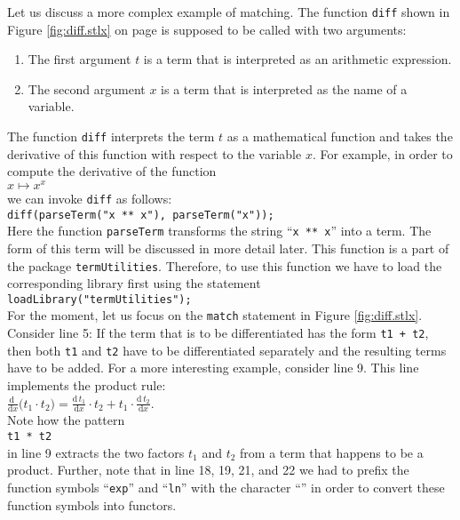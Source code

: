 Let us discuss a more complex example of matching.  The function \texttt{diff} shown in Figure
\ref{fig:diff.stlx} on page \pageref{fig:diff.stlx} is supposed to be called with two arguments:
\begin{enumerate}
\item The first argument $t$ is a term that is interpreted as an arithmetic expression.
\item The second argument $x$ is a term that is interpreted as  the name of a variable.
\end{enumerate}
The function \texttt{diff} interprets the term $t$ as a mathematical function and takes the
derivative of this function with respect to the variable $x$.  For example, in order to compute the
derivative of the function 
\\[0.2cm]
\hspace*{1.3cm}
$x \mapsto x^x$
\\[0.2cm]
we can invoke \texttt{diff} as follows:
\\[0.2cm]
\hspace*{1.3cm}
\texttt{diff(parseTerm("x ** x"), parseTerm("x"));}
\\[0.2cm]
Here the function \texttt{parseTerm} transforms the string ``\texttt{x ** x}'' into a term.  
The form of this term will be discussed in more detail later.  This function is a part of the
package \texttt{termUtilities}.  Therefore, to use this function we have to load the corresponding
library first using the statement
\\[0.2cm]
\hspace*{1.3cm}
\texttt{loadLibrary("termUtilities");}
\\[0.2cm]
For the moment, let us focus on the
\texttt{match} statement in Figure
\ref{fig:diff.stlx}.  Consider line 5: If the term that is to be differentiated has the form
\texttt{t1 + t2}, then both \texttt{t1} and \texttt{t2} have to be differentiated separately and the
resulting terms have to be added.  For a more interesting example, consider line 9.  This line
implements the product rule:
\\[0.2cm]
\hspace*{1.3cm}
$\displaystyle\frac{\mathrm{d}\;}{\mathrm{d}x} \bigl(t_1 \cdot t_2\bigr) = 
 \frac{\mathrm{d}\, t_1}{\mathrm{d}x} \cdot t_2 + t_1 \cdot \frac{\mathrm{d}\,t_2}{\mathrm{d}x}
$.
\\[0.2cm]
Note how the pattern 
\\[0.2cm]
\hspace*{1.3cm}
\texttt{t1 * t2}
\\[0.2cm]
in line 9 extracts the two factors $t_1$ and $t_2$ from a term that happens to be a product.
Further, note that in line 18, 19, 21, and 22 we had to prefix the function symbols ``\texttt{exp}'' and
``\texttt{ln}'' with the character ``\texttt{}'' in order to convert these function
symbols into functors. 

